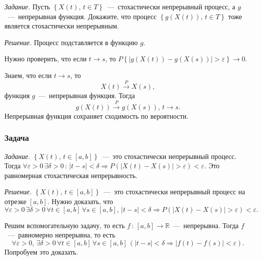 \textit{Задание.}
Пусть $ \left\{ X \left( t \right), \, t \in T \right\} $~---~стохастически непрерывный процесс,
а $g$~---~непрерывная функция.
Докажите, что процесс $ \left\{ g \left( X \left( t \right) \right), \, t \in T \right\} $
тоже является стохастически непрерывным.

\textit{Решение.}
Процесс подставляется в функцию $g$.

Нужно проверить, что если $t \to s$, то
$P \left\{
    \left| g \left( X \left( t \right) \right) - g \left( X \left( s \right) \right) \right| >
    \varepsilon \right\}
  \to 0$.

Знаем, что если $t \to s$, то
\begin{equation*}
  X \left( t \right) \overset{P}{ \to }
  X \left( s \right),
\end{equation*}
функция $g$~---~непрерывная функция.
Тогда
\begin{equation*}
  g \left( X \left( t \right) \right) \overset{P}{ \to } g \left( X \left( s \right) \right), \,
  t \to s.
\end{equation*}
Непрерывная функция сохраняет сходимость по вероятности.

\subsubsection*{Задача}

\textit{Задание.}
$ \left\{ X \left( t \right), \, t \in \left[ a, b \right] \right\}$~---~это
стохастически непрерывный процесс.
Тогда
$ \forall \varepsilon > 0 \,
  \exists \delta > 0 \, : \,
  \left| t - s \right| < \delta \Rightarrow
  P \left( \left| X \left( t \right) - X \left( s \right) \right| > \varepsilon \right) <
  \varepsilon $.
Это равномерная стохастическая непрерывность.

\textit{Решение.}
$ \left\{ X \left( t \right), \, t \in \left[ a, b \right] \right\}$~---~это
стохастически непрерывный процесс на отрезке $ \left[ a, b \right] $.
Нужно доказать, что
\begin{equation*}
  \forall \varepsilon > 0 \,
  \exists \delta > 0 \,
  \forall t \in \left[ a, b \right] \,
  \forall s \in \left[ a, b \right], \,
  \left| t - s \right| < \delta \Rightarrow
  P \left( \left| X \left( t \right) - X \left( s \right) \right| > \varepsilon \right) <
  \varepsilon.
\end{equation*}

Решим вспомогательную задачу, то есть $f \, : \, \left[ a, b \right] \to \mathbb{R}$~---~непрерывна.
Тогда $f$~---~равномерно непрерывна, то есть
\begin{equation*}
  \forall \varepsilon > 0, \,
  \exists \delta > 0 \,
  \forall t \in \left[ a, b \right] \,
  \forall s \in \left[ a, b \right] \,
  \left(
    \left| t - s \right| < \delta \Rightarrow
    \left| f \left( t \right) - f \left( s \right) \right| < \varepsilon \right).
\end{equation*}
Попробуем это доказать.


